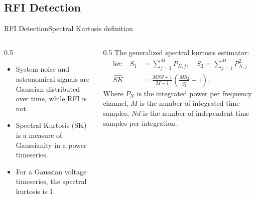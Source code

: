 \documentclass[aspectratio=169]{beamer}
\begin{document}
\subsection{RFI Detection}
\begin{frame}{RFI Detection}{Spectral Kurtosis definition}
  \begin{columns}[T]
    \begin{column}{0.5\linewidth}
      \begin{itemize}
        \item System noise and astronomical signals are Gaussian distributed over time, while RFI is not.
        \item Spectral Kurtosis (SK) \cite{nitaGeneralizedSpectralKurtosis2010} is a measure of Gaussianity in a power timeseries.
        \item For a Gaussian voltage timeseries, the spectral kurtosis is 1.
      \end{itemize}
    \end{column}
    \begin{column}{0.5\linewidth}
      \centering
      {The generalized spectral kurtosis estimator:}
      \begin{align*}
          \text{let:} \quad S_1 &= \sum_{j=1}^{M} P_{N,j}, \quad S_2 = \sum_{j=1}^{M} P_{N,j}^2 \\[4pt]
          \widehat{SK} &= \frac{M N d + 1}{M - 1} \left( \frac{M S_2}{S_1^2} - 1 \right),
      \end{align*}
      {\footnotesize Where $P_{N}$ is the integrated power per frequency channel, $M$ is the number of integrated time samples, $Nd$ is the number of independent time samples per integration.}
    \end{column}
  \end{columns}
\end{frame}
\end{document}
